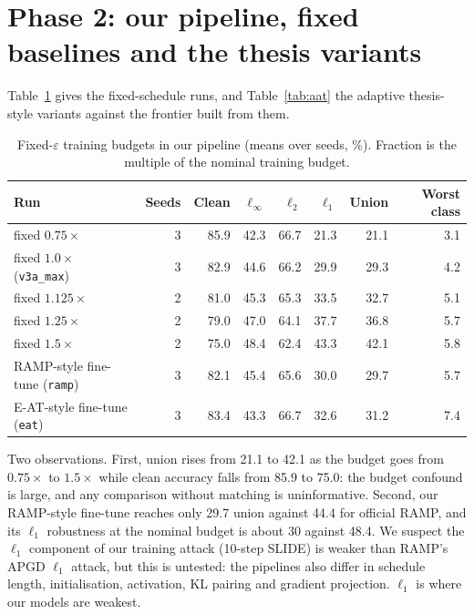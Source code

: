 \documentclass[11pt]{article}
\begin{document}
\section{Phase 2: our pipeline, fixed baselines and the thesis variants}
Table~\ref{tab:frontier} gives the fixed-schedule runs, and Table~\ref{tab:aat} the adaptive thesis-style variants against the frontier built from them.

\begin{table}[h]\centering\small
\caption{Fixed-$\varepsilon$ training budgets in our pipeline (means over seeds, \%). Fraction is the multiple of the nominal training budget.}\label{tab:frontier}
\begin{tabular}{lrrrrrrr}\toprule
Run & Seeds & Clean & $\ell_\infty$ & $\ell_2$ & $\ell_1$ & Union & Worst class\\\midrule
fixed $0.75\times$ & 3 & 85.9 & 42.3 & 66.7 & 21.3 & 21.1 & 3.1\\
fixed $1.0\times$ (\texttt{v3a\_max}) & 3 & 82.9 & 44.6 & 66.2 & 29.9 & 29.3 & 4.2\\
fixed $1.125\times$ & 2 & 81.0 & 45.3 & 65.3 & 33.5 & 32.7 & 5.1\\
fixed $1.25\times$ & 2 & 79.0 & 47.0 & 64.1 & 37.7 & 36.8 & 5.7\\
fixed $1.5\times$ & 2 & 75.0 & 48.4 & 62.4 & 43.3 & 42.1 & 5.8\\\midrule
RAMP-style fine-tune (\texttt{ramp}) & 3 & 82.1 & 45.4 & 65.6 & 30.0 & 29.7 & 5.7\\
E-AT-style fine-tune (\texttt{eat}) & 3 & 83.4 & 43.3 & 66.7 & 32.6 & 31.2 & 7.4\\\bottomrule
\end{tabular}
\end{table}

Two observations. First, union rises from 21.1 to 42.1 as the budget goes from $0.75\times$ to $1.5\times$ while clean accuracy falls from 85.9 to 75.0: the budget confound is large, and any comparison without matching is uninformative.
Second, our RAMP-style fine-tune reaches only 29.7 union against 44.4 for official RAMP, and its $\ell_1$ robustness at the nominal budget is about 30 against 48.4. We suspect the $\ell_1$ component of our training attack (10-step SLIDE) is weaker than RAMP's APGD $\ell_1$ attack, but this is untested: the pipelines also differ in schedule length, initialisation, activation, KL pairing and gradient projection. $\ell_1$ is where our models are weakest.
\end{document}

